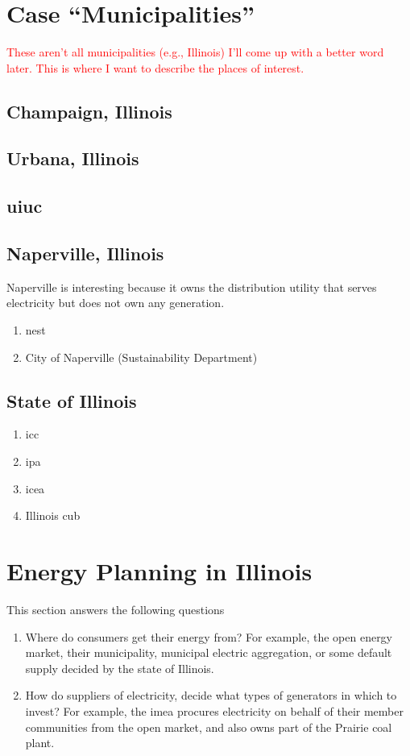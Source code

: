 \section{Case ``Municipalities''}
\label{section:cases}

\textcolor{red}{These aren't all municipalities (e.g., Illinois) I'll come up
with a better word later. This is where I want to describe the places of
interest.}

\subsection{Champaign, Illinois}
\subsection{Urbana, Illinois}
\subsection{\acf{uiuc}}
\subsection{Naperville, Illinois}
Naperville is interesting because it owns the distribution utility that serves
electricity but does not own any generation.
\begin{enumerate}
    \item \ac{nest}
    \item City of Naperville (Sustainability Department)
\end{enumerate}
\subsection{State of Illinois}
\begin{enumerate}
    \item \ac{icc}
    \item \ac{ipa}
    \item \ac{icea}
    \item Illinois \ac{cub}
\end{enumerate}


\section{Energy Planning in Illinois}

This section answers the following questions
\begin{enumerate}
    \item Where do consumers get their energy from? For example, the open energy
    market, their municipality, municipal electric aggregation, or some default
    supply decided by the state of Illinois.
    \item How do suppliers of electricity, decide what types of generators in
    which to invest? For example, the \ac{imea} procures electricity on behalf
    of their member communities from the open market, and also owns part of the
    Prairie coal plant.
\end{enumerate}



